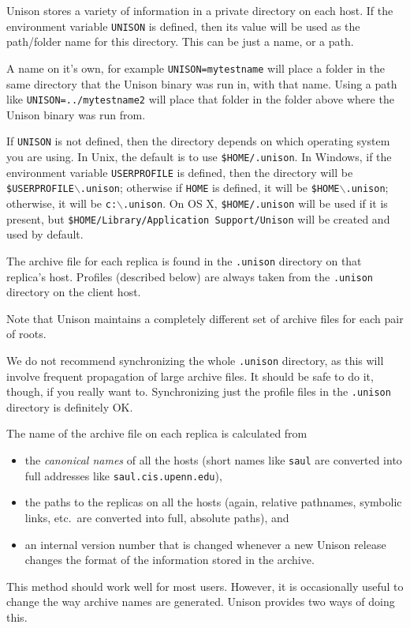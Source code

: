 \documentclass{article}
\begin{document}
Unison stores a variety of information in a private directory on each
host.  If the environment variable {\tt UNISON} is defined, then its
value will be used as the path/folder name for this directory.
This can be just a name, or a path.

A name on it's own, for example {\tt UNISON=mytestname} will
place a folder in the same directory that the Unison binary was run
in, with that name. Using a path like {\tt UNISON=../mytestname2}
will place that folder in the folder above where the Unison binary was
run from.

If {\tt UNISON} is not defined, then the directory depends on which
operating system you are using.  In Unix, the default is to use
{\tt \$HOME/.unison}.
In Windows, if the environment variable
{\tt USERPROFILE} is defined, then the directory will be
{\tt \$USERPROFILE$\backslash$.unison};
otherwise if {\tt HOME} is defined, it will be
{\tt \$HOME$\backslash$.unison};
otherwise, it will be
{\tt c:$\backslash$.unison}.
On OS X,
{\tt \$HOME/.unison} will be used if it is present, but
{\tt \$HOME/Library/Application Support/Unison} will be created and used by
default.

The archive file for each replica is found in the {\tt .unison}
directory on that replica's host.  Profiles (described below) are
always taken from the {\tt .unison} directory on the client host.

Note that Unison maintains a completely different set of archive files
for each pair of roots.

We do not recommend synchronizing the whole {\tt .unison} directory, as this
will involve frequent propagation of large archive files.  It should be safe
to do it, though, if you really want to.  Synchronizing just the profile
files in the {\tt .unison} directory is definitely OK.



The name of the archive file on each replica is calculated from
\begin{itemize}
\item the {\em canonical names} of all the hosts (short names like
  \verb|saul| are converted into full addresses like \verb|saul.cis.upenn.edu|),
\item the paths to the replicas on all the hosts (again, relative
  pathnames, symbolic links, etc.\ are converted into full, absolute paths), and
\item an internal version number that is changed whenever a new Unison
  release changes the format of the information stored in the archive.
\end{itemize}
This method should work well for most users.  However, it is occasionally
useful to change the way archive names are generated.  Unison provides
two ways of doing this.
\end{document}
